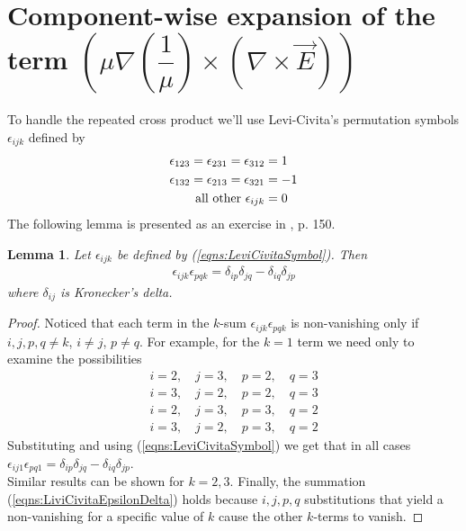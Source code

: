 \documentclass[twocolumn,secnumarabic,amssymb, nobibnotes, aps, prd]{revtex4-1}
\newtheorem{lem}{Lemma}[subsubsection]
\newtheorem{proof}{Proof}[subsubsection]
\begin{document}
\section{Component-wise expansion of the term $\left(\mu \nabla \left( \dfrac{1}{\mu}\right) \times \left(\nabla \times \vec{E} \right) \right)$}
\label{append:GradLogTermComponenetwiseDeriv}
To handle the repeated cross product we'll use Levi-Civita's permutation symbols $\epsilon_{ijk}$ \cite{ArfkenWeber2005} defined by
\begin{align}
\label{eqns:LeviCivitaSymbol}
\epsilon_{123} = \epsilon_{231} = \epsilon_{312} & = 1	\notag\\
\epsilon_{132} = \epsilon_{213} = \epsilon_{321} &= -1 \\
\text{all other } \epsilon_{ijk} &= 0	\notag
\end{align}
The following lemma is presented as an exercise in \cite{ArfkenWeber2005}, p. 150.
\begin{lem}
\label{lem:LiviCivitaEpsDelta}
Let $\epsilon_{ijk}$ be defined by (\ref{eqns:LeviCivitaSymbol}). Then
\begin{align}
\label{eqns:LiviCivitaEpsilonDelta} 
\epsilon_{ijk} \epsilon_{pqk} = \delta_{ip} \delta_{jq} - \delta_{iq} \delta_{jp}
\end{align} 
where $\delta_{ij}$ is Kronecker's delta.
\end{lem}

\begin{proof}
Noticed that each term in the $k$-sum $\epsilon_{ijk} \epsilon_{pqk}$ is non-vanishing only if $i,j,p,q \neq k$, $i \neq j$, $p \neq q$. For example, for the $k=1$ term we need only to examine the possibilities 
\begin{align*}
i=2,\quad j=3, \quad p=2, \quad q=3	\\
i=3,\quad j=2, \quad p=2, \quad q=3	\\
i=2,\quad j=3, \quad p=3, \quad q=2	\\
i=3,\quad j=2, \quad p=3, \quad q=2
\end{align*} 
Substituting and using (\ref{eqns:LeviCivitaSymbol}) we get that in all cases  $\epsilon_{ij1} \epsilon_{pq1} =  \delta_{ip} \delta_{jq} - \delta_{iq} \delta_{jp}$.\\
Similar results can be shown for $k=2,3$. Finally, the summation (\ref{eqns:LiviCivitaEpsilonDelta}) holds because $i,j,p,q$ substitutions that yield a non-vanishing for a specific value of $k$ cause the other $k$-terms to vanish.
\end{proof}
\end{document}
